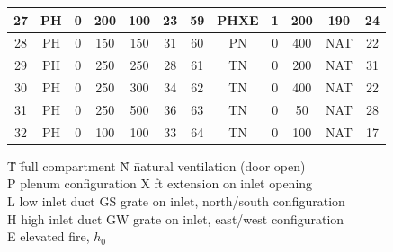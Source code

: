 \begin{table}[p]
\begin{center}
\begin{tabular}{|c|c|c|c|c|c||c|c|c|c|c|c|}
27   & PH      & 0     & 200        & 100       & 23          &   59   & PHXE    & 1     & 200        & 190       & 24          \\ \hline
28   & PH      & 0     & 150        & 150       & 31          &   60   & PN      & 0     & 400        & NAT       & 22          \\ \hline
29   & PH      & 0     & 250        & 250       & 28          &   61   & TN      & 0     & 200        & NAT       & 31          \\ \hline
30   & PH      & 0     & 250        & 300       & 34          &   62   & TN      & 0     & 400        & NAT       & 22          \\ \hline
31   & PH      & 0     & 250        & 500       & 36          &   63   & TN      & 0     & 50         & NAT       & 28          \\ \hline
32   & PH      & 0     & 100        & 100       & 33          &   64   & TN      & 0     & 100        & NAT       & 17          \\ \hline
\end{tabular}
\end{center}
\begin{tabbing}
\hspace{0.7in} \= T \hspace{0.2in}  \= full compartment     \hspace{0.8in} \= N \hspace{0.2in} \= natural ventilation (door open) \\
               \> P                 \> plenum configuration                \> X                 ft extension on inlet opening \\
               \> L                 \> low inlet duct                      \> GS               \> grate on inlet, north/south configuration \\
               \> H                 \> high inlet duct                     \> GW               \> grate on inlet, east/west configuration \\
               \> E                 \> elevated fire, $h_0$
\end{tabbing}
\label{LLNL_Matrix}
\end{table}

